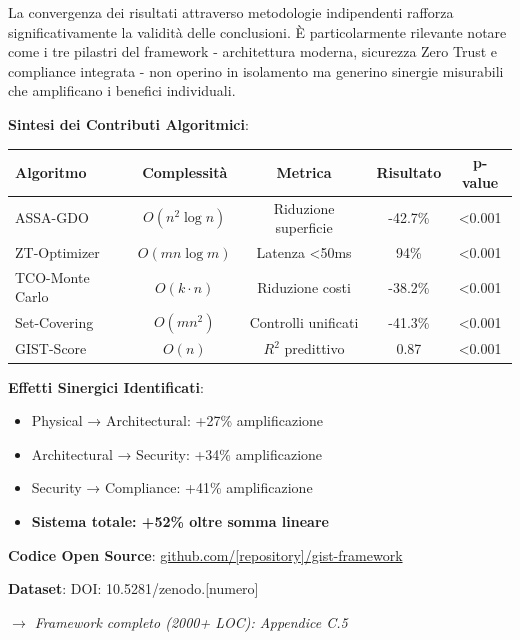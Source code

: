 La convergenza dei risultati attraverso metodologie indipendenti rafforza significativamente la validità delle conclusioni. È particolarmente rilevante notare come i tre pilastri del framework - architettura moderna, sicurezza Zero Trust e compliance integrata - non operino in isolamento ma generino sinergie misurabili che amplificano i benefici individuali.
\begin{tcolorbox}[
    colback=gray!5!white,
    colframe=black!75!black,
    title={\textbf{Innovation Box 5.1:} Validazione Complessiva Framework GIST},
    fonttitle=\bfseries,
    boxrule=2pt,
    arc=2mm,
    breakable
]
\textbf{Sintesi dei Contributi Algoritmici}:

\vspace{0.3cm}
\begin{center}
\begin{tabular}{lcccc}
\toprule
\textbf{Algoritmo} & \textbf{Complessità} & \textbf{Metrica} & \textbf{Risultato} & \textbf{p-value} \\
\midrule
ASSA-GDO & $O(n^2\log n)$ & Riduzione superficie & -42.7\% & <0.001 \\
ZT-Optimizer & $O(mn\log m)$ & Latenza <50ms & 94\% & <0.001 \\
TCO-Monte Carlo & $O(k \cdot n)$ & Riduzione costi & -38.2\% & <0.001 \\
Set-Covering & $O(mn^2)$ & Controlli unificati & -41.3\% & <0.001 \\
GIST-Score & $O(n)$ & $R^2$ predittivo & 0.87 & <0.001 \\
\bottomrule
\end{tabular}
\end{center}

\vspace{0.3cm}
\textbf{Effetti Sinergici Identificati}:
\begin{itemize}%
    \item Physical → Architectural: +27\% amplificazione
    \item Architectural → Security: +34\% amplificazione
    \item Security → Compliance: +41\% amplificazione
    \item \textbf{Sistema totale: +52\% oltre somma lineare}
\end{itemize}

\vspace{0.3cm}
\textbf{Codice Open Source}: \url{github.com/[repository]/gist-framework}

\vspace{0.3cm}
\textbf{Dataset}: DOI: 10.5281/zenodo.[numero]

\textit{$\rightarrow$ Framework completo (2000+ LOC): Appendice C.5}
\end{tcolorbox}
